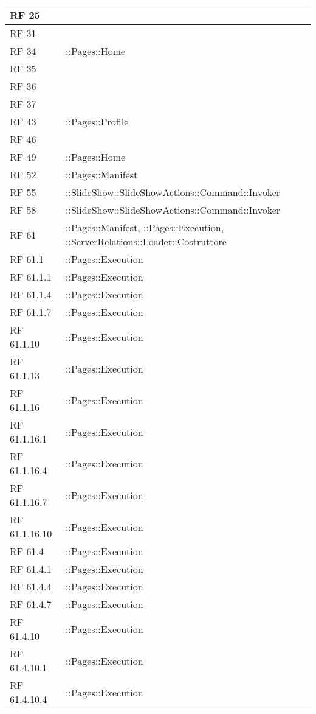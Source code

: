 {\begin{longtable} [c]{| p{2cm} | p{13cm} |}
RF 25 & \\ 
 \hline 
RF 31 & \\ 
 \hline 
RF 34 & ::\-Pages::\-Home\\ 
 \hline 
RF 35 & \\ 
 \hline 
RF 36 & \\ 
 \hline 
RF 37 & \\ 
 \hline 
RF 43 & ::\-Pages::\-Profile\\ 
 \hline 
RF 46 & \\ 
 \hline 
RF 49 & ::\-Pages::\-Home\\ 
 \hline 
RF 52 & ::\-Pages::\-Manifest\\ 
 \hline 
RF 55 & ::\-SlideShow::\-SlideShowActions::\-Command::\-Invoker\\ 
 \hline 
RF 58 & ::\-SlideShow::\-SlideShowActions::\-Command::\-Invoker\\ 
 \hline 
RF 61 & ::\-Pages::\-Manifest, ::\-Pages::\-Execution, ::\-ServerRelations::\-Loader::\-Costruttore\\ 
 \hline 
RF 61.1 & ::\-Pages::\-Execution\\ 
 \hline 
RF 61.1.1 & ::\-Pages::\-Execution\\ 
 \hline 
RF 61.1.4 & ::\-Pages::\-Execution\\ 
 \hline 
RF 61.1.7 & ::\-Pages::\-Execution\\ 
 \hline 
RF 61.1.10 & ::\-Pages::\-Execution\\ 
 \hline 
RF 61.1.13 & ::\-Pages::\-Execution\\ 
 \hline 
RF 61.1.16 & ::\-Pages::\-Execution\\ 
 \hline 
RF 61.1.16.1 & ::\-Pages::\-Execution\\ 
 \hline 
RF 61.1.16.4 & ::\-Pages::\-Execution\\ 
 \hline 
RF 61.1.16.7 & ::\-Pages::\-Execution\\ 
 \hline 
RF 61.1.16.10 & ::\-Pages::\-Execution\\ 
 \hline 
RF 61.4 & ::\-Pages::\-Execution\\ 
 \hline 
RF 61.4.1 & ::\-Pages::\-Execution\\ 
 \hline 
RF 61.4.4 & ::\-Pages::\-Execution\\ 
 \hline 
RF 61.4.7 & ::\-Pages::\-Execution\\ 
 \hline 
RF 61.4.10 & ::\-Pages::\-Execution\\ 
 \hline 
RF 61.4.10.1 & ::\-Pages::\-Execution\\ 
 \hline 
RF 61.4.10.4 & ::\-Pages::\-Execution\\ 

\end{longtable}}

